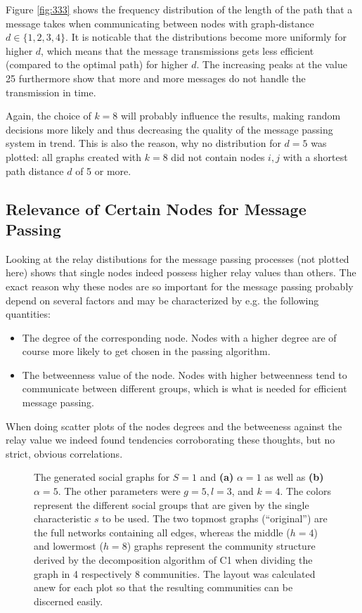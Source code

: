 \documentclass{scrartcl}
\begin{document}
Figure \ref{fig:333} shows the frequency distribution of the length of the
path that a message takes when communicating between nodes with
graph-distance $d\in\{1, 2, 3, 4\}$. It is noticable that the distributions
become more uniformly for higher $d$, which means that the message
transmissions gets less efficient (compared to the optimal path) for higher
$d$. The increasing peaks at the value 25 furthermore show that more and
more messages do not handle the transmission in time.

Again, the choice of $k = 8$ will probably influence the results, making
random decisions more likely and thus decreasing the quality of the message
passing system in trend. This is also the reason, why no distribution for
$d = 5$ was plotted: all graphs created with $ k = 8$ did not contain nodes
$i,j$ with a shortest path distance $d$ of 5 or more.

\subsection{Relevance of Certain Nodes for Message Passing}
Looking at the relay distibutions for the message passing processes (not
plotted here) shows that single nodes indeed possess higher relay values
than others. The exact reason why these nodes are so important for the
message passing probably depend on several factors and may be characterized
by e.g. the following quantities:
\begin{itemize}
   \item The degree of the corresponding node. Nodes with a higher degree
       are of course more likely to get chosen in the passing algorithm.
   \item The betweenness value of the node. Nodes with higher betweenness
       tend to communicate between different groups, which is what is
       needed for efficient message passing.
\end{itemize}
When doing scatter plots of the nodes degrees and the betweeness against
the relay value we indeed found tendencies corroborating these thoughts,
but no strict, obvious correlations.


\begin{figure}
    \centering
    \def\svgwidth{0.9\textwidth}
    
    \caption{The generated social graphs for $S=1$ and \textbf{(a)} $\alpha = 1$
    as well as \textbf{(b)} $\alpha = 5$. The other parameters were $g = 5,
    l = 3$, and $k = 4$. The colors represent the different
    social groups that are given by the single characteristic $s$ to be
    used.  The two topmost graphs (\enquote{original}) are the full
    networks containing all edges, whereas the middle ($h = 4$) and
    lowermost ($h=8$) graphs represent the community structure derived by
    the decomposition algorithm of C1 when dividing the graph in
    4 respectively 8 communities.
    The layout was calculated anew for each plot so that the resulting
    communities can be discerned easily.}
    \label{fig:331}
\end{figure}
\end{document}
